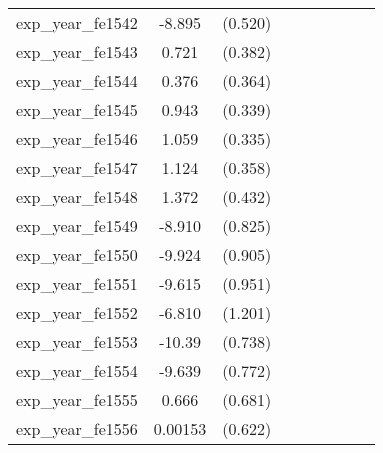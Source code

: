 {\begin{tabular}{l*{4}{cc}}
exp\_year\_fe1542&   -8.895\sym{***}&  (0.520)&                  &         &                  &         &                  &         \\
exp\_year\_fe1543&    0.721         &  (0.382)&                  &         &                  &         &                  &         \\
exp\_year\_fe1544&    0.376         &  (0.364)&                  &         &                  &         &                  &         \\
exp\_year\_fe1545&    0.943\sym{**} &  (0.339)&                  &         &                  &         &                  &         \\
exp\_year\_fe1546&    1.059\sym{**} &  (0.335)&                  &         &                  &         &                  &         \\
exp\_year\_fe1547&    1.124\sym{**} &  (0.358)&                  &         &                  &         &                  &         \\
exp\_year\_fe1548&    1.372\sym{**} &  (0.432)&                  &         &                  &         &                  &         \\
exp\_year\_fe1549&   -8.910\sym{***}&  (0.825)&                  &         &                  &         &                  &         \\
exp\_year\_fe1550&   -9.924\sym{***}&  (0.905)&                  &         &                  &         &                  &         \\
exp\_year\_fe1551&   -9.615\sym{***}&  (0.951)&                  &         &                  &         &                  &         \\
exp\_year\_fe1552&   -6.810\sym{***}&  (1.201)&                  &         &                  &         &                  &         \\
exp\_year\_fe1553&   -10.39\sym{***}&  (0.738)&                  &         &                  &         &                  &         \\
exp\_year\_fe1554&   -9.639\sym{***}&  (0.772)&                  &         &                  &         &                  &         \\
exp\_year\_fe1555&    0.666         &  (0.681)&                  &         &                  &         &                  &         \\
exp\_year\_fe1556&  0.00153         &  (0.622)&                  &         &                  &         &                  &         \\

\end{tabular}}
